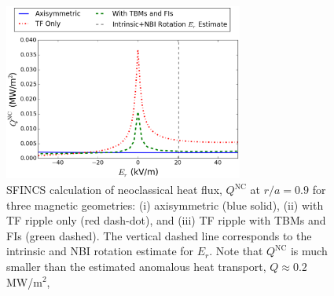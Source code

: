\documentclass[aip, pop, preprint]{revtex4-1}
\numberwithin{figure}{section}
\numberwithin{equation}{section}
\begin{document}
\begin{figure}[h!]
\centering
\includegraphics[width=0.7\textwidth]{figure12.eps}
\caption{\label{fig:HeatFlux} SFINCS calculation of neoclassical heat flux, $Q^{\mathrm{NC}}$ at $r/a = 0.9$ for three magnetic geometries: (i) axisymmetric (blue solid), (ii) with TF ripple only (red dash-dot), and (iii) TF ripple with TBMs and FIs (green dashed). The vertical dashed line corresponds to the intrinsic and NBI rotation estimate for $E_r$. Note that $Q^{\mathrm{NC}}$ is much smaller than the estimated anomalous heat transport, $Q\approx 0.2$ MW/m$^2$,}
\end{figure}

\FloatBarrier
\end{document}
